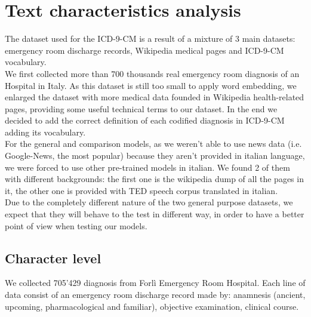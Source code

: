 \chapter{Text characteristics analysis}
The dataset used for the ICD-9-CM is a result of a mixture of 3 main datasets: emergency room discharge records, Wikipedia medical pages and ICD-9-CM vocabulary.\\
We first collected more than 700 thousands real emergency room diagnosis of an Hospital in Italy. As this dataset is still too small to apply word embedding, we enlarged the dataset with more medical data founded in Wikipedia health-related pages, providing some useful technical terms to our dataset. In the end we decided to add the correct definition of each codified diagnosis in ICD-9-CM adding its vocabulary.\\
For the general and comparison models, as we weren't able to use news data (i.e. Google-News, the most popular) because they aren't provided in italian language, we were forced to use other pre-trained models in italian. We found 2 of them with different backgrounds: the first one is the wikipedia dump of all the pages in it, the other one is provided with TED speech corpus translated in italian.\\
Due to the completely different nature of the two general purpose datasets, we expect that they will behave to the test in different way, in order to have a better point of view when testing our models.

\section{Character level}

We collected 705'429 diagnosis from Forlì Emergency Room Hospital. Each line of data consist of an emergency room discharge record made by: anamnesis (ancient, upcoming, pharmacological and familiar), objective examination, clinical course.

